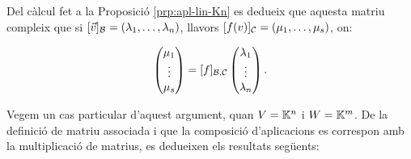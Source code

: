 \documentclass[
  11pt,
]{book}
\numberwithin{dummy}{section}
\theoremstyle{maincolornumbox}
\theoremstyle{blacknumex}
\theoremstyle{blacknumbox}
\theoremstyle{maincolornum}
\newlength\esp
\begin{document}
Del càlcul fet a la Proposició
\ref{prp:apl-lin-Kn} es dedueix que aquesta matriu compleix que
si \([\vec v]_{\mathcal{B}}=(\lambda_1,\dots,\lambda_n)\), llavors
\([f(v)]_{\mathcal{C}}=(\mu_1,\dots,\mu_s)\), on:

\begin{align}
\label{eq:matriu-apl-lineal}
    \begin{pmatrix}
    \mu_1 \\ \vdots \\ \mu_s
    \end{pmatrix}=
    [f]_{\mathcal{B},\mathcal{C}}
    \begin{pmatrix}
    \lambda_1 \\ \vdots \\ \lambda_n
    \end{pmatrix}.
\end{align}

Vegem un cas particular d'aquest argument, quan \(V=\mathbb{K}^n\) i \(W=\mathbb{K}^m\). De
la definició de matriu associada i que la composició d'aplicacions es
correspon amb la multiplicació de matrius, es dedueixen els resultats
següents:
\end{document}
